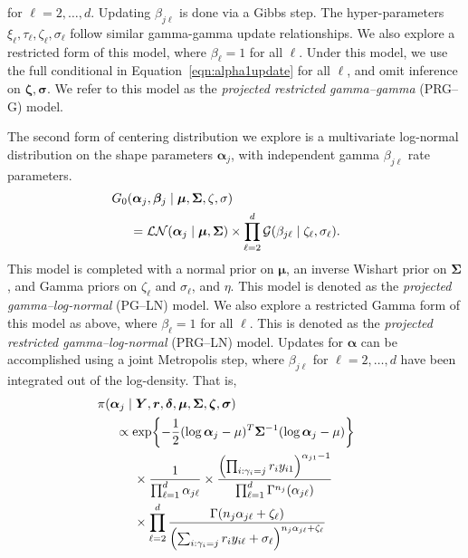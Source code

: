 for $\ell = 2,\ldots, d$.  Updating $\beta_{j\ell}$ is done via a Gibbs step.  The hyper-parameters
$\xi_{\ell},\tau_{\ell},\zeta_{\ell},\sigma_{\ell}$ follow similar gamma-gamma update relationships.
We also explore a restricted form of this model, where $\beta_{\ell} = 1$ for all $\ell$.  Under this 
model, we use the full conditional in Equation~\eqref{eqn:alpha1update} for all $\ell$, and omit 
inference on $\bm{\zeta},\bm{\sigma}$.  We refer to this model as the 
\emph{projected restricted gamma--gamma} (PRG--G) model.

The second form of centering distribution we explore is a multivariate log-normal distribution on the shape parameters $\bm{\alpha}_j$, with independent gamma $\beta_{j\ell}$ rate parameters.  
    \begin{equation}
        \begin{aligned}
        &\hspace{-0.5cm}G_0\left(\bm{\alpha}_j,\bm{\beta}_j\mid\bm{\mu},\bm{\Sigma},\zeta,\sigma\right) \\
        &=\mathcal{LN}\left(\bm{\alpha}_j\mid\bm{\mu},\bm{\Sigma}\right)\times\prod_{\ell = 2}^d\mathcal{G}\left(\beta_{j\ell}\mid\zeta_{\ell},\sigma_{\ell}\right).
        \end{aligned}
    \end{equation}
    This model is completed with a normal prior on $\bm{\mu}$, an inverse Wishart prior on
    $\bm{\Sigma}$, and Gamma priors on $\zeta_{\ell}$ and $\sigma_{\ell}$, and $\eta$.  
    This model is denoted as the \emph{projected gamma--log-normal} (PG--LN) model.  
    We also explore a restricted Gamma form of this model as above, where 
    $\beta_{\ell} = 1$ for all $\ell$.  This is denoted as the 
    \emph{projected restricted gamma--log-normal} (PRG--LN) model.  Updates for 
    $\bm{\alpha}$ can be accomplished using a joint Metropolis step, where 
    $\beta_{j\ell}$ for $\ell = 2,\ldots,d$ have been integrated out of the 
    log-density.  That is,
    \begin{equation*}
        \begin{aligned}
        &\hspace{-0.5cm}\pi(\bm{\alpha}_j\mid\bm{Y},\bm{r},\bm{\delta},\bm{\mu},\bm{\Sigma},\bm{\zeta},\bm{\sigma})\\
        &\propto \exp\left\lbrace-\frac{1}{2}(\log\bm{\alpha}_j - \mu)^T\bm{\Sigma}^{-1}(\log\bm{\alpha}_j - \mu)\right\rbrace \\
        &\hspace{0.5cm}\times\frac{1}{\prod_{\ell = 1}^d\alpha_{j\ell}}\times \frac{\left(\prod_{i:\gamma_i = j}r_iy_{i1}\right)^{\alpha_{j1} - 1}}{\prod_{\ell = 1}^d\Gamma^{n_j}(\alpha_{j\ell})}\\
        &\hspace{0.5cm}\times \prod_{\ell = 2}^d\frac{\Gamma\left(n_j\alpha_{j\ell} + \zeta_{\ell}\right)}{\left(\sum_{i:\gamma_i = j}r_iy_{i\ell} + \sigma_{\ell}\right)^{n_j\alpha_{j\ell} + \zeta_{\ell}}}
        \end{aligned}
    \end{equation*}

